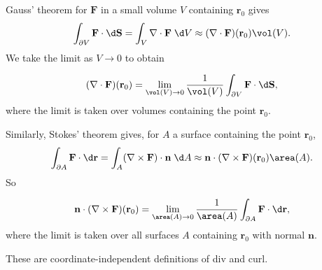 \documentclass[a4paper]{article}
\begin{document}
Gauss' theorem for $\mathbf{F}$ in a small volume $V$ containing $\mathbf{r}_0$ gives
\[
  \int_{\partial V}\mathbf{F}\cdot \d \mathbf{S} = \int_V\nabla\cdot \mathbf{F}\;\d V\approx (\nabla\cdot \mathbf{F})(\mathbf{r}_0) \vol(V).
\]
We take the limit as $V\to 0$ to obtain
\begin{prop}
  \[
    (\nabla \cdot \mathbf{F})(\mathbf{r}_0) = \lim_{\vol(V) \to 0} \frac{1}{\vol(V)}\int_{\partial V}\mathbf{F}\cdot \d \mathbf{S},
  \]
  where the limit is taken over volumes containing the point $\mathbf{r}_0$.
\end{prop}
Similarly, Stokes' theorem gives, for $A$ a surface containing the point $\mathbf{r}_0$,
\[
  \int _{\partial A}\mathbf{F}\cdot \d \mathbf{r} = \int_A(\nabla\times \mathbf{F})\cdot \mathbf{n}\;\d A \approx \mathbf{n}\cdot (\nabla\times \mathbf{F})(\mathbf{r}_0) \area(A).
\]
So
\begin{prop}
  \[
    \mathbf{n}\cdot (\nabla \times \mathbf{F})(\mathbf{r}_0) = \lim_{\area(A) \to 0}\frac{1}{\area(A)}\int_{\partial A}\mathbf{F}\cdot \d \mathbf{r},
  \]
  where the limit is taken over all surfaces $A$ containing $\mathbf{r}_0$ with normal $\mathbf{n}$.
\end{prop}
These are coordinate-independent definitions of div and curl.
\end{document}
